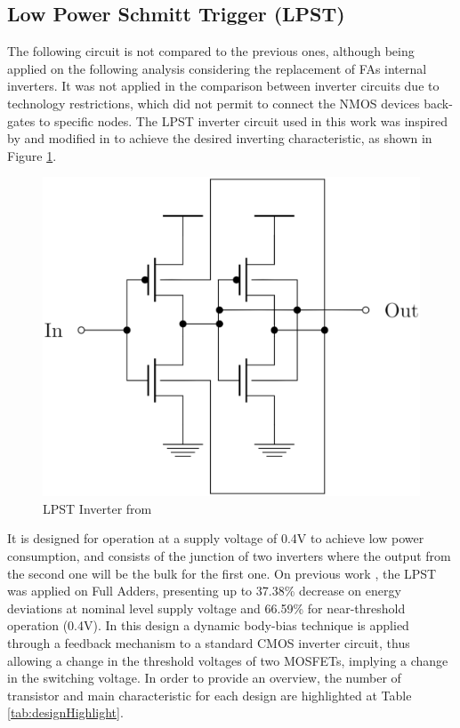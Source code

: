 \documentclass[diss,pgmicro,english]{iiufrgs}
\begin{document}
\subsection{Low Power Schmitt Trigger (LPST)}

The following circuit is not compared to the previous ones, although being applied on the following analysis considering the replacement of FAs internal inverters. It was not applied in the comparison between inverter circuits due to technology restrictions, which did not permit to connect the NMOS devices back-gates to specific nodes. The LPST inverter circuit used in this work was inspired by \cite{zhang2003low} and modified in \cite{dokania2015circuit} to achieve the desired inverting characteristic, as shown in Figure \ref{fig:LPST}.

\begin{figure}[h]
  \centering
  \includegraphics[width=.5\linewidth]{STOriginal.eps}
  \caption{LPST Inverter from \citet{dokania2015circuit}}
  \label{fig:LPST}
\end{figure}

It is designed for operation at a supply voltage of 0.4V to achieve low power consumption, and consists of the junction of two inverters where the output from the second one will be the bulk for the first one. On previous work \cite{moraes2018evaluation}, the LPST was applied on Full Adders, presenting up to 37.38\% decrease on energy deviations at nominal level supply voltage and 66.59\% for near-threshold operation (0.4V). In this design a dynamic body-bias technique is applied through a feedback mechanism to a standard CMOS inverter circuit, thus allowing a change in the threshold voltages of two MOSFETs, implying a change in the switching voltage. In order to provide an overview, the number of transistor and main characteristic for each design are highlighted at Table \ref{tab:designHighlight}.
\end{document}
